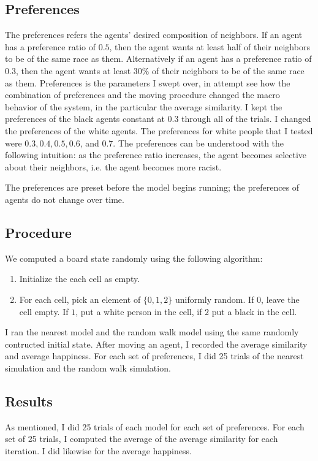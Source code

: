 \documentclass[11pt,twoside]{amsart}
\theoremstyle{theorem}
\theoremstyle{definition}
\theoremstyle{remark}
\begin{document}
\subsection{Preferences}
The preferences refers the agents' desired composition of neighbors.
If an agent has a preference ratio of $0.5$, then the agent wants at least half of their neighbors to be of the same race as them.
Alternatively if an agent has a preference ratio of $0.3$, then the agent wants at least $30\%$ of their neighbors to be of the same race as them.
Preferences is the parameters I swept over, in attempt see how the combination of preferences and the moving procedure changed the macro behavior of the system, in the particular the average similarity.
I kept the preferences of the black agents constant at $0.3$ through all of the trials.
I changed the preferences of the white agents. 
The preferences for white people that I tested were $0.3, 0.4, 0.5, 0.6$, and $0.7$. 
The preferences can be understood with the following intuition: as the preference ratio increases, the agent becomes selective about their neighbors, i.e. the agent becomes more racist. 

The preferences are preset before the model begins running; the preferences of agents do not change over time. 


\subsection{Procedure}
We computed a board state randomly using the following algorithm: 
\begin{enumerate}
    \item Initialize the each cell as empty.
    \item For each cell, pick an element of $\{0,1,2\}$ uniformly random. If $0$, leave the cell empty. If $1$, put a white person in the cell, if $2$ put a black in the cell.
\end{enumerate}
I ran the nearest model and the random walk model using the same randomly contructed initial state. 
After moving an agent, I recorded the average similarity and average happiness. 
For each set of preferences, I did 25 trials of the nearest simulation and the random walk simulation.

\subsection{Results}
As mentioned, I did 25 trials of each model for each set of preferences. 
For each set of 25 trials, I computed the average of the average similarity for each iteration. 
I did likewise for the average happiness. 
\end{document}
